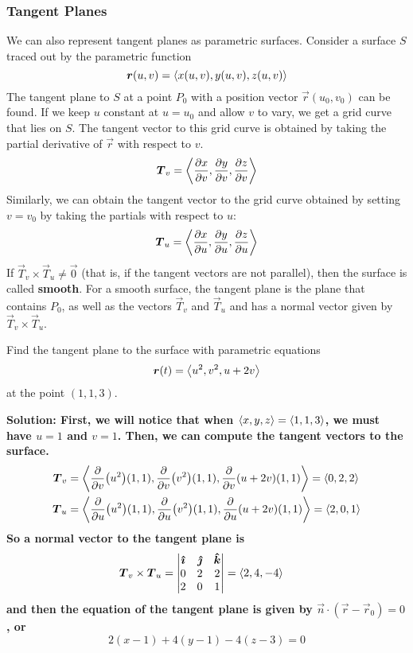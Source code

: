\subsubsection{Tangent Planes}
We can also represent tangent planes as parametric surfaces. Consider a surface $S$ traced out by the parametric function 
\[ \boldsymbol{r}(u,v) = \left\langle x(u,v), y(u,v), z(u,v)\right\rangle\]
The tangent plane to $S$ at a point $P_0$ with a position vector $\vec r(u_0, v_0)$ can be found. If we keep $u$ constant at $u=u_0$ and allow $v$ to vary, we get a grid curve that lies on $S$. The tangent vector to this grid curve is obtained by taking the partial derivative of $\vec r$ with respect to $v$.
\[ \vec T_v = \< \pdv{x}{v}(u_0, v_0), \pdv{y}{v}(u_0, v_0), \pdv{z}{v}(u_0,v_0) \> \]
Similarly, we can obtain the tangent vector to the grid curve obtained by setting $v=v_0$ by taking the partials with respect to $u$:
\[ \vec T_u = \< \pdv{x}{u}(u_0, v_0), \pdv{y}{u}(u_0, v_0), \pdv{z}{u}(u_0,v_0) \> \]
If $\vec T_v \times \vec T_u \neq \vec 0$ (that is, if the tangent vectors are not parallel), then the surface is called \textbf{smooth}. For a smooth surface, the tangent plane is the plane that contains $P_0$, as well as the vectors $\vec T_v$ and $\vec T_u$ and has a normal vector given by $\vec T_v \times \vec T_u$.
\begin{example}
    Find the tangent plane to the surface with parametric equations
    \[ \boldsymbol{r}(t) = \left\langle u^2, v^2, u+2v\right\rangle \]
    at the point $(1,1,3)$.\par
    \bf{Solution:} First, we will notice that when $\left\langle x,y,z\right\rangle = \left\langle1,1,3\right\rangle$, we must have $u = 1$ and $v = 1$. Then, we can compute the tangent vectors to the surface.
    \begin{align*}
        \boldsymbol{T}_v &= \left\langle \pdv{v}(u^2)(1,1), \pdv{v}(v^2)(1,1), \pdv{v}(u+2v)(1,1)\right\rangle = \left\langle0, 2, 2\right\rangle \\
        \boldsymbol{T}_u &= \left\langle \pdv{u}(u^2)(1,1), \pdv{u}(v^2)(1,1), \pdv{u}(u+2v)(1,1)\right\rangle = \left\langle 2, 0, 1\right\rangle
    \end{align*}
    So a normal vector to the tangent plane is
    \begin{align*}
        \boldsymbol{T}_v\times \boldsymbol{T}_u &= \begin{vmatrix} \boldsymbol{\hat{\imath}} & \boldsymbol{\hat{\jmath}} & \boldsymbol{\hat{k}} \\ 0 & 2 & 2 \\ 2 & 0 & 1\end{vmatrix} = \left\langle 2, 4, -4\right\rangle
    \end{align*}
    and then the equation of the tangent plane is given by $\vec n \cdot (\vec r-\vec r_0)=0$, or
    \[ 2(x-1) + 4(y-1) - 4(z-3) = 0\]
\end{example}
